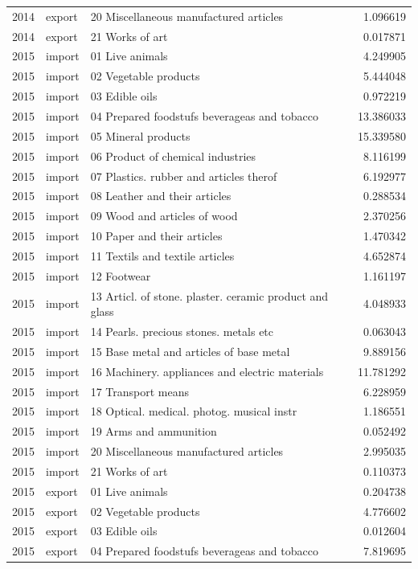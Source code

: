 \begin{tabular}{rllr}
2014 & export & 20 Miscellaneous manufactured articles & 1.096619 \\
2014 & export & 21 Works of art & 0.017871 \\
2015 & import & 01 Live animals & 4.249905 \\
2015 & import & 02 Vegetable products & 5.444048 \\
2015 & import & 03 Edible oils & 0.972219 \\
2015 & import & 04 Prepared foodstufs beverageas and tobacco & 13.386033 \\
2015 & import & 05 Mineral products & 15.339580 \\
2015 & import & 06 Product of chemical industries & 8.116199 \\
2015 & import & 07 Plastics. rubber and articles therof & 6.192977 \\
2015 & import & 08 Leather and their articles & 0.288534 \\
2015 & import & 09 Wood and articles of wood & 2.370256 \\
2015 & import & 10 Paper and their articles & 1.470342 \\
2015 & import & 11 Textils and textile articles & 4.652874 \\
2015 & import & 12 Footwear & 1.161197 \\
2015 & import & 13 Articl. of stone. plaster. ceramic product and glass & 4.048933 \\
2015 & import & 14 Pearls. precious stones. metals etc & 0.063043 \\
2015 & import & 15 Base metal and articles of base metal & 9.889156 \\
2015 & import & 16 Machinery. appliances and electric materials & 11.781292 \\
2015 & import & 17 Transport means & 6.228959 \\
2015 & import & 18 Optical. medical. photog. musical instr & 1.186551 \\
2015 & import & 19 Arms and ammunition & 0.052492 \\
2015 & import & 20 Miscellaneous manufactured articles & 2.995035 \\
2015 & import & 21 Works of art & 0.110373 \\
2015 & export & 01 Live animals & 0.204738 \\
2015 & export & 02 Vegetable products & 4.776602 \\
2015 & export & 03 Edible oils & 0.012604 \\
2015 & export & 04 Prepared foodstufs beverageas and tobacco & 7.819695 \\

\end{tabular}
